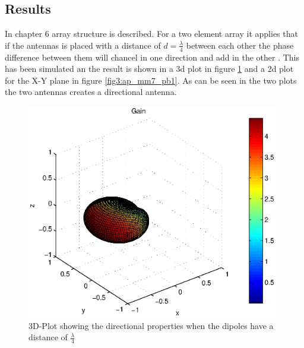 \subsection{Results}
In \citep{lit:AT} chapter 6 array structure is described. For a two element array it applies that if the antennas is placed with a distance of $d=\frac{\lambda}{4}$ between each other the phase difference between them will chancel in one direction and add in the other \citep[Sec. 6.2]{lit:AT}. This has been simulated an the result is shown in a 3d plot in figure \ref{fig2:ap_mm7_pb1} and a 2d plot for the X-Y plane in figure \ref{fig3:ap_mm7_pb1}. As can be seen in the two plots the two antennas creates a directional antenna.

\begin{figure}[!h]
  \centering
  \includegraphics[width=11cm]{figures/two_dipoles_lambda_4.eps}
  \caption{3D-Plot showing the directional properties when the dipoles have a distance of $\frac{\lambda}{4}$}
  \label{fig2:ap_mm7_pb1}
\end{figure}
